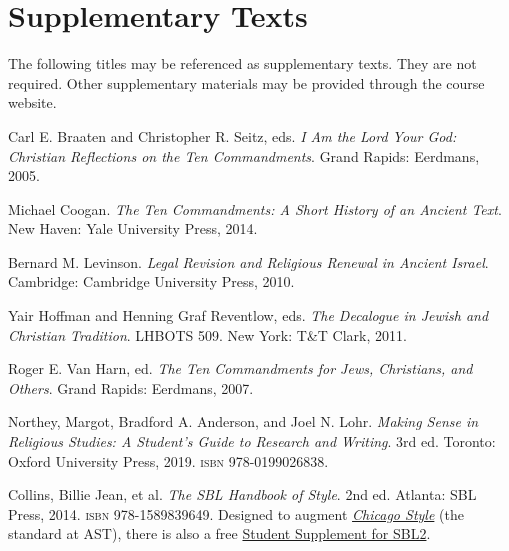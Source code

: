 \documentclass[titlepage]{article}
\begin{document}
\section{Supplementary Texts}
\label{supplementary}

The following titles may be referenced as supplementary texts. They are
not required. Other supplementary materials may be provided through the
course website.

\begingroup
\renewcommand{\section}[2]{}%
\begin{thebibliography}{3}%

	 Carl E. Braaten and Christopher R. Seitz, eds.
	\emph{I Am the Lord Your God: Christian Reflections on the Ten Commandments}.
	Grand Rapids: Eerdmans, 2005.%

	 Michael Coogan.
    \emph{The Ten Commandments: A Short History of an Ancient Text}.
    New Haven: Yale University Press, 2014.%

	 Bernard M. Levinson.
	\emph{Legal Revision and Religious Renewal in Ancient Israel}.
	Cambridge: Cambridge University Press, 2010.

	 Yair Hoffman and Henning Graf Reventlow, eds.
	\emph{The Decalogue in Jewish and Christian Tradition}.
	LHBOTS 509. New York: T\&T Clark, 2011.

	 Roger E. Van Harn, ed.
	\emph{The Ten Commandments for Jews, Christians, and Others}.
	Grand Rapids: Eerdmans, 2007.

	 Northey, Margot, Bradford A. Anderson, and Joel N. Lohr.
	\emph{Making Sense in Religious Studies: A Student's Guide to Research and Writing}.
	3rd ed. Toronto: Oxford University Press, 2019. \textsc{isbn} 978-0199026838.

	 Collins, Billie Jean, et al.
	\emph{The SBL Handbook of Style}.
	2nd ed. Atlanta: SBL Press, 2014. \textsc{isbn} 978-1589839649.
	Designed to augment \href{http://www.chicagomanualofstyle.org/home.html}{\emph{Chicago Style}}
	(the standard at AST), there is also a free
	\href{https://www.sbl-site.org/wp-content/uploads/2025/04/SBLHSsupp2015-02.pdf}{Student Supplement for SBL2}.


\end{thebibliography}
\endgroup
\end{document}
